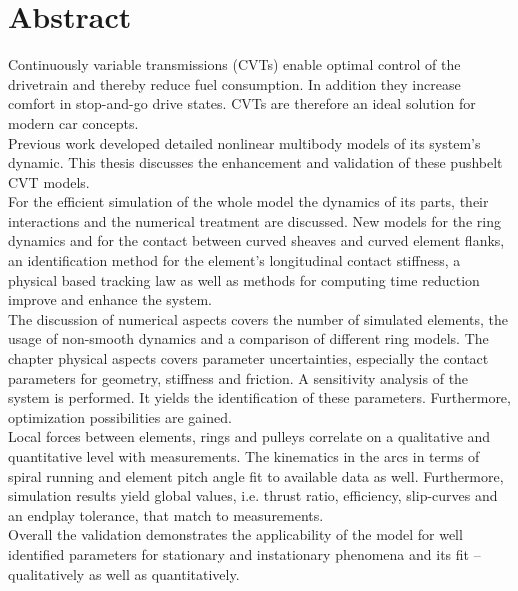 \section*{Abstract}

Continuously variable transmissions (CVTs) enable optimal control of the drivetrain and thereby reduce fuel consumption.
In addition they increase comfort in stop-and-go drive states.
CVTs are therefore an ideal solution for modern car concepts.\\
Previous work developed detailed nonlinear multibody models of its system's dynamic.
This thesis discusses the enhancement and validation of these pushbelt CVT models.\\
For the efficient simulation of the whole model the dynamics of its parts, their interactions and the numerical treatment are discussed.
New models for the ring dynamics and for the contact between curved sheaves and curved element flanks, an identification method for the element's longitudinal contact stiffness, a physical based tracking law as well as methods for computing time reduction improve and enhance the system.\\
The discussion of numerical aspects covers the number of simulated elements, the usage of non-smooth dynamics and a comparison of different ring models.
The chapter physical aspects covers parameter uncertainties, especially the contact parameters for geometry, stiffness and friction.
A sensitivity analysis of the system is performed.
It yields the identification of these parameters.
Furthermore, optimization possibilities are gained.\\
Local forces between elements, rings and pulleys correlate on a qualitative and quantitative level with measurements. 
The kinematics in the arcs in terms of spiral running and element pitch angle fit to available data as well.
Furthermore, simulation results yield global values, i.e. thrust ratio, efficiency, slip-curves and an endplay tolerance, that match to measurements.\\
Overall the validation demonstrates the applicability of the model for well identified parameters for stationary and instationary phenomena and its fit -- qualitatively as well as quantitatively.
\newpage
